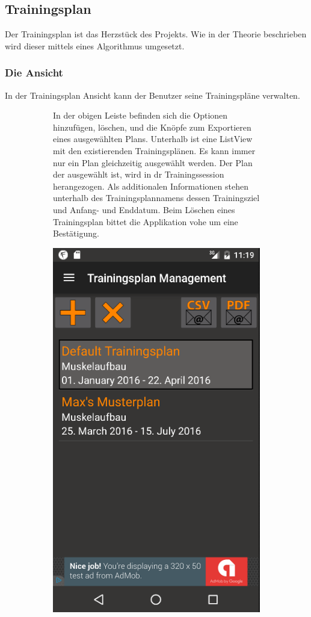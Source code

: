 \documentclass[FIPLY_base.tex]{subfiles}
\begin{document}
	\subsection{Trainingsplan}
		Der Trainingsplan ist das Herzstück des Projekts. Wie in der Theorie beschrieben wird dieser mittels eines Algorithmus umgesetzt. 
	\subsubsection{Die Ansicht}
		 In der Trainingsplan Ansicht kann der Benutzer seine Trainingspläne verwalten.
		 \begin{figure}[H]
			\begin{subfigure}[b]{0.4\textwidth}
				In der obigen Leiste befinden sich die Optionen \grqq{}hinzufügen\grqq{}, \grqq{}löschen\grqq{}, und die Knöpfe zum Exportieren eines ausgewählten Plans.\newline
				Unterhalb ist eine ListView mit den existierenden Trainingsplänen. Es kann immer nur ein Plan gleichzeitig ausgewählt werden. Der Plan der ausgewählt ist, wird in dr Trainingssession herangezogen. Als additionalen Informationen stehen unterhalb des Trainingsplannamens dessen Trainingsziel und Anfang- und Enddatum.
				Beim Löschen eines Trainingsplan  bittet die Applikation vohe um eine Bestätigung.
				\newline\newline\newline\newline
			\end{subfigure}
			\hfil
		 	\begin{subfigure}[b]{0.4\textwidth}
		 		\includegraphics[scale=0.50]{img/tplanmgmt}

\end{subfigure}
\end{figure}
\end{document}
